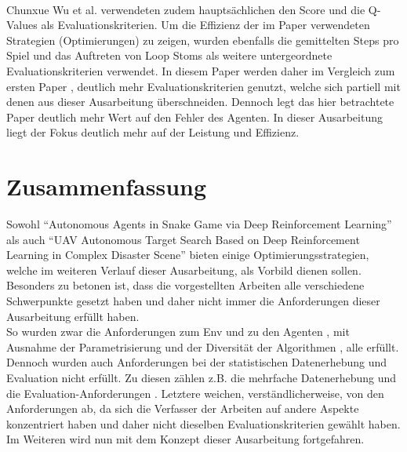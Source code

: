 \\Chunxue Wu et al. verwendeten zudem hauptsächlichen den Score und die Q-Values als Evaluationskriterien. Um die Effizienz der im Paper verwendeten Strategien (Optimierungen) zu zeigen, wurden ebenfalls die gemittelten Steps pro Spiel und das Auftreten von Loop Stoms als weitere untergeordnete Evaluationskriterien verwendet. In diesem Paper werden daher im Vergleich zum ersten Paper , deutlich mehr Evaluationskriterien genutzt, welche sich partiell mit denen aus dieser Ausarbeitung überschneiden. Dennoch legt das hier betrachtete Paper deutlich mehr Wert auf den Fehler des Agenten. In dieser Ausarbeitung liegt der Fokus deutlich mehr auf der Leistung und Effizienz.


\section{Zusammenfassung} \label{sec:Verwandte_Arbeiten_Zusammenfassung}
Sowohl "`Autonomous Agents in Snake Game via Deep Reinforcement Learning"'  als auch "`UAV Autonomous Target Search Based on Deep Reinforcement Learning in Complex Disaster Scene"'  bieten einige Optimierungsstrategien, welche im weiteren Verlauf dieser Ausarbeitung, als Vorbild dienen sollen.\\
Besonders zu betonen ist, dass die vorgestellten Arbeiten alle verschiedene Schwerpunkte gesetzt haben und daher nicht immer die Anforderungen dieser Ausarbeitung erfüllt haben.\\ 
So wurden zwar die Anforderungen zum Env  und zu den Agenten , mit Ausnahme der Parametrisierung  und der Diversität der Algorithmen , alle erfüllt. Dennoch wurden auch Anforderungen bei der statistischen Datenerhebung und Evaluation nicht erfüllt. Zu diesen zählen z.B. die mehrfache Datenerhebung  und die Evaluation-Anforderungen . Letztere weichen, verständlicherweise, von den Anforderungen ab, da sich die Verfasser der Arbeiten auf andere Aspekte konzentriert haben und daher nicht dieselben Evaluationskriterien gewählt haben.\\
Im Weiteren wird nun mit dem Konzept dieser Ausarbeitung fortgefahren.